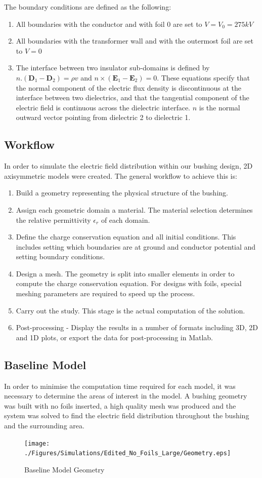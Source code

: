 The boundary conditions are defined as the following:
\begin{enumerate}
\item All boundaries with the conductor and with foil 0 are set to $V = V_0 = 275kV$
\item All boundaries with the transformer wall and with the outermost foil are set to $V = 0$
\item The interface between two insulator sub-domains is defined by $n.(\mathbf{D}_{1} -\mathbf{D}_{2}) = \rho v$ and $n\times(\mathbf{E}_{1} -\mathbf{E}_{2}) = 0$. These equations specify that the normal component of the electric flux density is discontinuous at the interface between two dielectrics, and that the tangential component of the electric field is continuous across the dielectric interface. $n$ is the normal outward vector pointing from dielectric 2 to dielectric 1.
\end{enumerate}

\subsection{Workflow}
In order to simulate the electric field distribution within our bushing design, 2D axisymmetric models were created. The general workflow to achieve this is:
\begin{enumerate}
\item Build a geometry representing the physical structure of the bushing.
\item Assign each geometric domain a material. The material selection determines the relative permittivity $\epsilon_r$ of each domain.
\item Define the charge conservation equation and all initial conditions. This includes setting which boundaries are at ground and conductor potential and setting boundary conditions.
\item Design a mesh. The geometry is split into smaller elements in order to compute the charge conservation equation. For designs with foils, special meshing parameters are required to speed up the process.
\item Carry out the study. This stage is the actual computation of the solution.
\item Post-processing - Display the results in a number of formats including 3D, 2D and 1D plots, or export the data for post-processing in Matlab.
\end{enumerate}


\subsection{Baseline Model}
In order to minimise the computation time required for each model, it was necessary to determine the areas of interest in the model.
A bushing geometry was built with no foils inserted, a high quality mesh was produced and the system was solved to find the electric field distribution throughout the bushing and the surrounding area.
\begin{figure}[!h]
  \centering
    \texttt{[image: ./Figures/Simulations/Edited\_No\_Foils\_Large/Geometry.eps]} 
\caption{Baseline Model Geometry}
\label{Figure:No_Foil_Large_Geom}
\end{figure}


